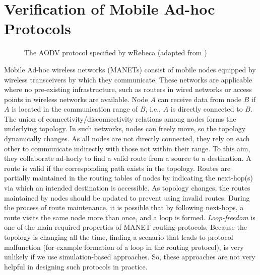 \section{Verification of Mobile Ad-hoc Protocols}\label{sec::wrebeca} 
\begin{figure*}
	\begin{center}
		
	\end{center}
	\caption{The AODV protocol specified by wRebeca (adapted from \cite{FOAC}) \label{code:aodv}}
\end{figure*} 

Mobile Ad-hoc wireless networks (MANETs) consist of mobile nodes equipped by wireless transceivers by which they communicate. These networks are applicable where no pre-existing infrastructure, such as routers in wired networks or access points in wireless networks 
are available.  
Node $A$ can receive data from  node $B$ if $A$ is located in the communication range of $B$, i.e., $A$ is directly connected to $B$. The union of connectivity/disconnectivity relations among nodes forms the underlying topology.  In such networks, nodes can freely move, so the %
topology dynamically changes. As all nodes are not directly connected, they rely on each other to communicate indirectly with those not within their range. To this aim, they collaborate ad-hocly to find a valid route from a source to a destination. A route is valid if the corresponding path exists in the topology. Routes are partially maintained in the routing tables of nodes by indicating the next-hop(s) via which an intended destination is accessible. As topology changes, the routes maintained by nodes should be updated to prevent using  invalid routes. %
During the process of route maintenance, it is possible that by following next-hops, a route visits the same node more than once, and a loop is formed. 
\emph{Loop-freedom} is one of the main required properties of MANET routing protocols. Because the topology is changing all the time, finding a scenario that leads to protocol malfunction (for example  formation of a loop in the routing protocol), is very unlikely if we use  simulation-based approaches. So, these approaches are not very helpful in designing such protocols in practice. 


